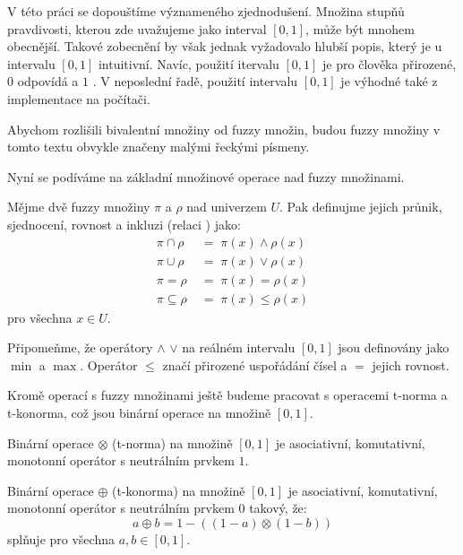 \documentclass[a4paper,10pt]{article}
\begin{document}
V této práci se dopouštíme význameného zjednodušení. Množina stupňů pravdivosti, kterou zde uvažujeme jako interval $[0, 1]$, může být mnohem obecnější. Takové zobecnění by však jednak vyžadovalo hlubší popis, který je u intervalu $[0, 1]$ intuitivní. Navíc, použití itervalu $[0, 1]$ je pro člověka přirozené, $0$ odpovídá  a $1$ . V neposlední řadě, použití intervalu $[0, 1]$ je výhodné také z implementace na počítači.


\begin{notation*}
 Abychom rozlišili  bivalentní množiny od fuzzy množin, budou fuzzy množiny v tomto textu obvykle značeny malými řeckými písmeny.
\end{notation*}

Nyní se podíváme na základní množinové operace nad fuzzy množinami.
\begin{definition}
 Mějme dvě fuzzy množiny $\pi$ a $\rho$ nad univerzem $U$. Pak definujme jejich průnik, sjednocení, rovnost a inkluzi (relaci ) jako:
 \begin{align*}
  \pi \cap \rho 	\; &= \; \pi(x) \wedge \rho(x) \\
  \pi \cup \rho 	\; &= \; \pi(x) \vee \rho(x) \\
  \pi = \rho 		\; &= \; \pi(x) = \rho(x) \\
  \pi \subseteq \rho 	\; &= \; \pi(x) \le \rho(x) 
 \end{align*}
 pro všechna $x \in U$.
\end{definition}

Připomeňme, že operátory $\wedge$ $\vee$ na reálném intervalu $[0, 1]$ jsou definovány jako $\min$ a $\max$. Operátor $\le$ značí přirozené uspořádání čísel a $=$ jejich rovnost.

Kromě operací s fuzzy množinami ještě budeme pracovat s operacemi t-norma a t-konorma, což jsou binární operace na množině $[0,1]$.
\begin{definition}
 Binární operace $\otimes$ (t-norma) na množině $[0,1]$ je asociativní, komutativní, monotonní operátor s neutrálním prvkem $1$.
 
 Binární operace $\oplus$  (t-konorma) na množině $[0,1]$ je asociativní, komutativní, monotonní operátor s neutrálním prvkem $0$ takový, že:
 $$
  a \oplus b = 1 - ((1 - a) \otimes (1 - b))
 $$
 splňuje pro všechna $a, b \in [0,1]$.
\end{definition}
\end{document}
